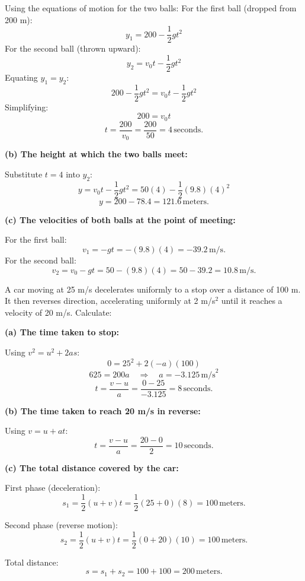 \documentclass[addpoints]{exam}
\begin{document}
\begin{questions}
\begin{solution}[12cm]
Using the equations of motion for the two balls:  
For the first ball (dropped from 200 m):  
\[
y_1 = 200 - \frac{1}{2} g t^2
\]  
For the second ball (thrown upward):  
\[
y_2 = v_0 t - \frac{1}{2} g t^2
\]  
Equating \(y_1 = y_2\):  
\[
200 - \frac{1}{2} g t^2 = v_0 t - \frac{1}{2} g t^2
\]  
Simplifying:  
\[
200 = v_0 t
\]  
\[
t = \frac{200}{v_0} = \frac{200}{50} = 4 \, \text{seconds.}
\]

\textbf{(b) The height at which the two balls meet:}

Substitute \(t = 4\) into \(y_2\):  
\[
y = v_0 t - \frac{1}{2} g t^2 = 50(4) - \frac{1}{2}(9.8)(4)^2
\]  
\[
y = 200 - 78.4 = 121.6 \, \text{meters.}
\]

\textbf{(c) The velocities of both balls at the point of meeting:}

For the first ball:  
\[
v_1 = -g t = -(9.8)(4) = -39.2 \, \text{m/s.}
\]  
For the second ball:  
\[
v_2 = v_0 - g t = 50 - (9.8)(4) = 50 - 39.2 = 10.8 \, \text{m/s.}
\]
\end{solution}



\question A car moving at 25 m/s decelerates uniformly to a stop over a distance of 100 m. It then reverses direction, accelerating uniformly at 2 m/s$^2$ until it reaches a velocity of 20 m/s. Calculate:
\begin{solution}[5cm]
    \textbf{(a) The time taken to stop:}

Using \(v^2 = u^2 + 2as\):  
\[
0 = 25^2 + 2(-a)(100)
\]  
\[
625 = 200a \quad \Rightarrow \quad a = -3.125 \, \text{m/s}^2
\]  
\[
t = \frac{v - u}{a} = \frac{0 - 25}{-3.125} = 8 \, \text{seconds.}
\]

\textbf{(b) The time taken to reach 20 m/s in reverse:}

Using \(v = u + at\):  
\[
t = \frac{v - u}{a} = \frac{20 - 0}{2} = 10 \, \text{seconds.}
\]

\textbf{(c) The total distance covered by the car:}

First phase (deceleration):  
\[
s_1 = \frac{1}{2} (u + v) t = \frac{1}{2} (25 + 0)(8) = 100 \, \text{meters.}
\]  

Second phase (reverse motion):  
\[
s_2 = \frac{1}{2} (u + v) t = \frac{1}{2} (0 + 20)(10) = 100 \, \text{meters.}
\]  

Total distance:  
\[
s = s_1 + s_2 = 100 + 100 = 200 \, \text{meters.}
\]
\end{solution}


\end{questions}
\end{document}
